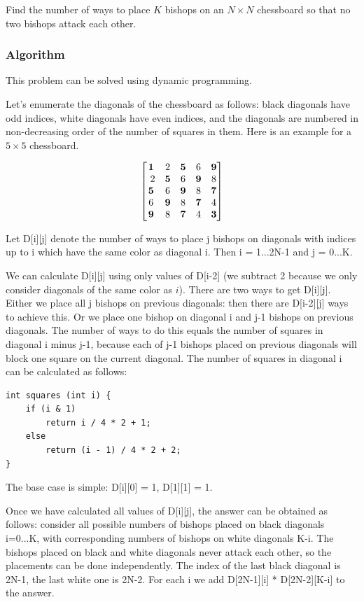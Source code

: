 \documentclass[8pt, a4paper, oneside, twocolumn]{extarticle}
\begin{document}
Find the number of ways to place $K$ bishops on an $N \times N$ chessboard so that no two bishops attack each other.
\subsubsection{Algorithm}

This problem can be solved using dynamic programming.

Let's enumerate the diagonals of the chessboard as follows: black diagonals have odd indices, white diagonals have even indices, and the diagonals are numbered in non-decreasing order of the number of squares in them. Here is an example for a $5 \times 5$ chessboard.

\[\begin{bmatrix} \bf{1} & 2 & \bf{5} & 6 & \bf{9} \\\
2 & \bf{5} & 6 & \bf{9} & 8 \\
\bf{5} & 6 & \bf{9} & 8 & \bf{7} \\
6 & \bf{9} & 8 & \bf{7} & 4 \\
\bf{9} & 8 & \bf{7} & 4 & \bf{3} \\
\end{bmatrix}\]

Let D[i][j] denote the number of ways to place j bishops on diagonals with indices up to i which have the same color as diagonal i. Then i = 1...2N-1 and j = 0...K.

We can calculate D[i][j] using only values of D[i-2] (we subtract 2 because we only consider diagonals of the same color as $i$). There are two ways to get D[i][j]. Either we place all j bishops on previous diagonals: then there are D[i-2][j] ways to achieve this. Or we place one bishop on diagonal i and j-1 bishops on previous diagonals. The number of ways to do this equals the number of squares in diagonal i minus j-1, because each of j-1 bishops placed on previous diagonals will block one square on the current diagonal. The number of squares in diagonal i can be calculated as follows:
\begin{verbatim}
int squares (int i) {
    if (i & 1)
        return i / 4 * 2 + 1;
    else
        return (i - 1) / 4 * 2 + 2;
}
\end{verbatim}
The base case is simple: D[i][0] = 1, D[1][1] = 1.

Once we have calculated all values of D[i][j], the answer can be obtained as follows: consider all possible numbers of bishops placed on black diagonals i=0...K, with corresponding numbers of bishops on white diagonals K-i. The bishops placed on black and white diagonals never attack each other, so the placements can be done independently. The index of the last black diagonal is 2N-1, the last white one is 2N-2. For each i we add D[2N-1][i] * D[2N-2][K-i] to the answer.
\end{document}
